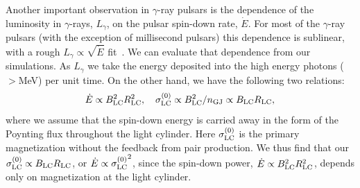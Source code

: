 \begin{figure}[htb]
\end{figure}

Another important observation in $\gamma$-ray pulsars is the dependence of the luminosity in $\gamma$-rays, $L_\gamma$, on the pulsar spin-down rate, $\dot{E}$. For most of the $\gamma$-ray pulsars (with the exception of millisecond pulsars) this dependence is sublinear, with a rough $L_\gamma\propto \sqrt{\dot{E}}$ fit~\citep{2013ApJS..208...17A}. We can evaluate that dependence from our simulations. As $L_\gamma$ we take the energy deposited into the high energy photons ($>$MeV) per unit time. On the other hand, we have the following two relations:
\begin{equation}
    \dot{E}\propto B_{\rm LC}^2 R_{\rm LC}^2,~~~\sigma^{(0)}_{\rm LC}\propto B_{\rm LC}^2 / n_{\rm GJ}\propto B_{\rm LC}R_{\rm LC},
\end{equation}
where we assume that the spin-down energy is carried away in the form of the Poynting flux throughout the light cylinder. Here $\sigma^{(0)}_{\rm LC}$ is the primary magnetization without the feedback from pair production. We thus find that our $\sigma^{(0)}_{\rm LC}\propto B_{\rm LC}R_{\rm LC}$, or $\dot{E}\propto {\sigma^{(0)}_{\rm LC}}^2$, since the spin-down power, $\dot{E}\propto B_{\rm LC}^2 R_{\rm LC}^2$, depends only on magnetization at the light cylinder.\par

